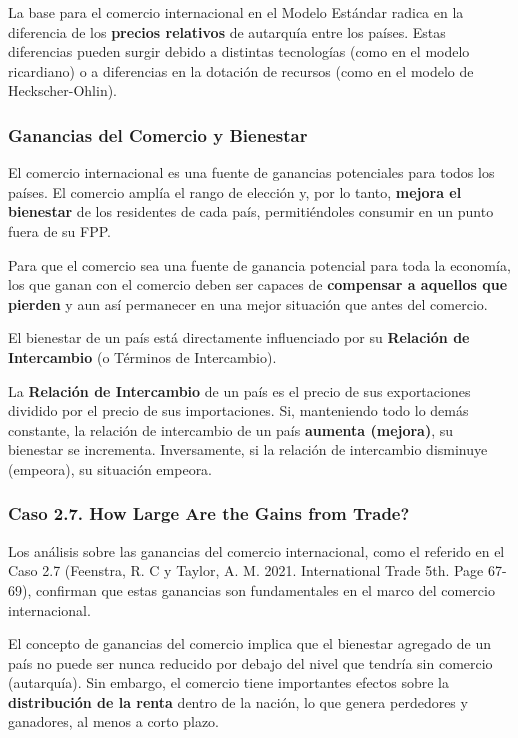La base para el comercio internacional en el Modelo Estándar radica en la diferencia de los \textbf{precios relativos} de autarquía entre los países. Estas diferencias pueden surgir debido a distintas tecnologías (como en el modelo ricardiano) o a diferencias en la dotación de recursos (como en el modelo de Heckscher-Ohlin).

\subsubsection{Ganancias del Comercio y Bienestar}
El comercio internacional es una fuente de ganancias potenciales para todos los países. El comercio amplía el rango de elección y, por lo tanto, \textbf{mejora el bienestar} de los residentes de cada país, permitiéndoles consumir en un punto fuera de su FPP.

\begin{proposicion}
Para que el comercio sea una fuente de ganancia potencial para toda la economía, los que ganan con el comercio deben ser capaces de \textbf{compensar a aquellos que pierden} y aun así permanecer en una mejor situación que antes del comercio.
\end{proposicion}

El bienestar de un país está directamente influenciado por su \textbf{Relación de Intercambio} (o Términos de Intercambio).

\begin{definicion}
La \textbf{Relación de Intercambio} de un país es el precio de sus exportaciones dividido por el precio de sus importaciones. Si, manteniendo todo lo demás constante, la relación de intercambio de un país \textbf{aumenta (mejora)}, su bienestar se incrementa. Inversamente, si la relación de intercambio disminuye (empeora), su situación empeora.
\end{definicion}

\subsubsection{Caso 2.7. How Large Are the Gains from Trade?}
Los análisis sobre las ganancias del comercio internacional, como el referido en el Caso 2.7 (Feenstra, R. C y Taylor, A. M. 2021. International Trade 5th. Page 67-69), confirman que estas ganancias son fundamentales en el marco del comercio internacional.

\begin{nota}
El concepto de ganancias del comercio implica que el bienestar agregado de un país no puede ser nunca reducido por debajo del nivel que tendría sin comercio (autarquía). Sin embargo, el comercio tiene importantes efectos sobre la \textbf{distribución de la renta} dentro de la nación, lo que genera perdedores y ganadores, al menos a corto plazo.
\end{nota}

